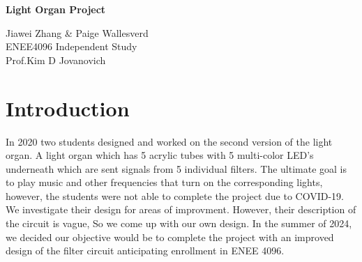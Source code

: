 \documentclass[12pt,a4paper]{article}
\begin{document}
\large{
    \begin{titlepage}
    \centering
    \vspace*{\fill}

    \vspace*{0.5cm}

    \huge\bfseries
    Light Organ Project

    \vspace*{0.5cm}

    \large Jiawei Zhang \& Paige Wallesverd \\
    ENEE4096 Independent Study \\
    Prof.Kim D Jovanovich

    \vspace*{\fill}
    \end{titlepage}
    \section*{Introduction}
    In 2020 two students designed and worked on the second version of the light organ. 
    A light organ which has 5 acrylic tubes with 5 multi-color LED's underneath which are sent signals from 5 individual filters. The ultimate goal is to play music and other frequencies that turn on the corresponding lights, however, the students were not able to complete the project due to COVID-19. We investigate their design for areas of improvment. However, their description of the circuit is vague, So we come up with our own design.
    In the summer of 2024, we decided our objective would be to complete the project with an improved design of the filter circuit anticipating enrollment in ENEE 4096.


    
    
}
\end{document}
